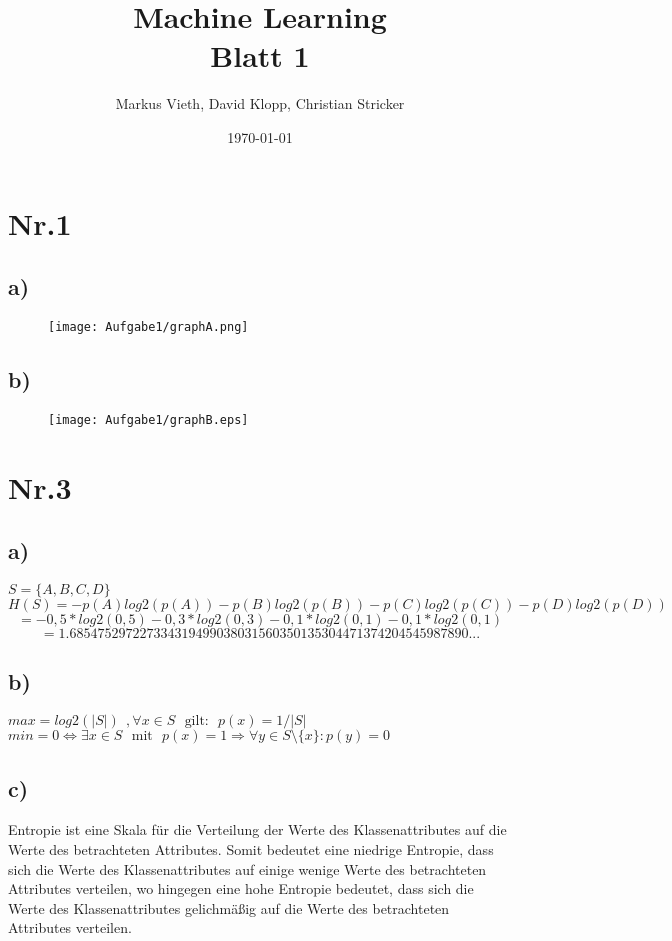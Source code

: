 \documentclass[a4paper,11pt,twoside]{article}
\title{Machine Learning\\ Blatt 1}
\author{Markus Vieth, David Klopp, Christian Stricker}
\date{\today}
\begin{document}
\maketitle
\cleardoublepage
\pagestyle{myheadings}

\section*{Nr.1}

\subsection*{a)}
\begin{figure}[h]
\texttt{[image: Aufgabe1/graphA.png]}
\end{figure}

\subsection*{b)}
\begin{figure}[h]
\texttt{[image: Aufgabe1/graphB.eps]}
\end{figure}

\newpage

\section*{Nr.3}
\subsection*{a)}
$S = \{A,B,C,D\}$ 
\[ H(S) = -p(A)log2(p(A))-p(B)log2(p(B))-p(C)log2(p(C))-p(D)log2(p(D)) \]
\[ = -0,5*log2(0,5)-0,3*log2(0,3)-0,1*log2(0,1)-0,1*log2(0,1) \]
\[ = 1.685475297227334319499038031560350135304471374204545987890...\]

\subsection*{b)}
$max = log2(|S|)~~,\forall x \in S ~~~\text{gilt:}~~~ p(x) = 1/|S|$\\
$min = 0 \Leftrightarrow \exists x \in S ~~~\text{mit}~~~ p(x) = 1  \Rightarrow \forall y \in S \setminus \{x\} : p(y) = 0$

\subsection*{c)}
Entropie ist eine Skala für die Verteilung der Werte des Klassenattributes auf die Werte des betrachteten Attributes. Somit bedeutet eine niedrige Entropie, dass sich die Werte des Klassenattributes auf einige wenige Werte des betrachteten Attributes verteilen, wo hingegen eine hohe Entropie bedeutet, dass sich die Werte des Klassenattributes gelichmäßig auf die Werte des betrachteten Attributes verteilen.
\end{document}

